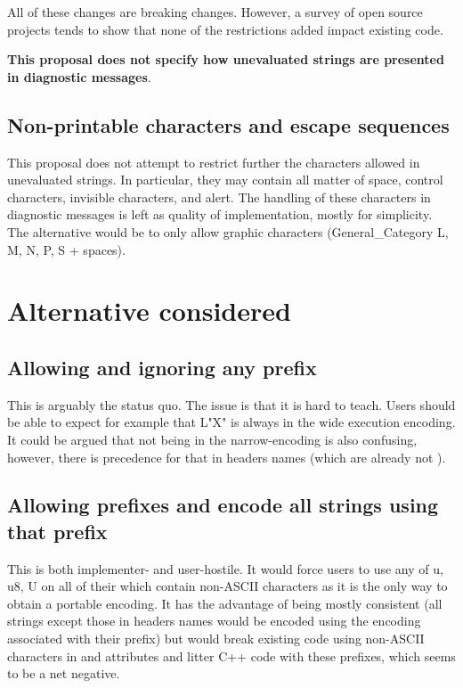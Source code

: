 \documentclass{wg21}
\begin{document}
All of these changes are breaking changes.
However, a survey of open source projects tends to show that none of the restrictions added
impact existing code.

\textbf{This proposal does not specify how unevaluated strings are presented in diagnostic messages}.

\subsection{Non-printable characters and escape sequences}

This proposal does not attempt to restrict further the characters allowed in unevaluated strings.
In particular, they may contain all matter of space, control characters, invisible characters, and alert.
The handling of these characters in diagnostic messages is left as quality of implementation, mostly
for simplicity. The alternative would be to only allow graphic characters (General_Category L, M, N, P, S + spaces).

\section{Alternative considered}

\subsection{Allowing and ignoring any prefix}

This is arguably the status quo.
The issue is that it is hard to teach. Users should be able to expect for example that L"X"
is always in the wide execution encoding.
It could be argued that  not being in the narrow-encoding is also confusing, however, there is precedence for that in headers names (which are already not ).

\subsection{Allowing prefixes and encode all strings using that prefix}

This is both implementer- and user-hostile. It would force users to use any of u, u8, U
on all of their  which contain non-ASCII characters as it is the only way to obtain a portable encoding.
It has the advantage of being mostly consistent (all strings except those in headers names would be encoded using the encoding associated with their prefix) but would break
existing code using non-ASCII characters in  and attributes and
litter C++ code with these prefixes, which seems to be a net negative.
\end{document}
